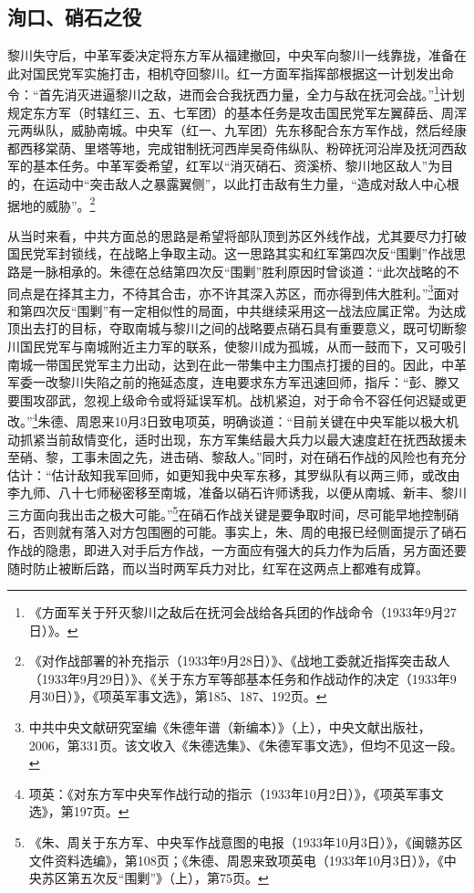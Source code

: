 \subsection{洵口、硝石之役}


黎川失守后，中革军委决定将东方军从福建撤回，中央军向黎川一线靠拢，准备在此对国民党军实施打击，相机夺回黎川。红一方面军指挥部根据这一计划发出命令：“首先消灭进逼黎川之敌，进而会合我抚西力量，全力与敌在抚河会战。”\footnote{《方面军关于歼灭黎川之敌后在抚河会战给各兵团的作战命令（1933年9月27日）》。}计划规定东方军（时辖红三、五、七军团）的基本任务是攻击国民党军左翼薛岳、周浑元两纵队，威胁南城。中央军（红一、九军团）先东移配合东方军作战，然后经康都西移棠荫、里塔等地，完成钳制抚河西岸吴奇伟纵队、粉碎抚河沿岸及抚河西敌军的基本任务。中革军委希望，红军以“消灭硝石、资溪桥、黎川地区敌人”为目的，在运动中“突击敌人之暴露翼侧”，以此打击敌有生力量，“造成对敌人中心根据地的威胁”。\footnote{《对作战部署的补充指示（1933年9月28日）》、《战地工委就近指挥突击敌人（1933年9月29日）》、《关于东方军等部基本任务和作战动作的决定（1933年9月30日）》，《项英军事文选》，第185、187、192页。}


从当时来看，中共方面总的思路是希望将部队顶到苏区外线作战，尤其要尽力打破国民党军封锁线，在战略上争取主动。这一思路其实和红军第四次反“围剿”作战思路是一脉相承的。朱德在总结第四次反“围剿”胜利原因时曾谈道：“此次战略的不同点是在择其主力，不待其合击，亦不许其深入苏区，而亦得到伟大胜利。”\footnote{中共中央文献研究室编《朱德年谱（新编本）》（上），中央文献出版社，2006，第331页。该文收入《朱德选集》、《朱德军事文选》，但均不见这一段。}面对和第四次反“围剿”有一定相似性的局面，中共继续采用这一战法应属正常。为达成顶出去打的目标，夺取南城与黎川之间的战略要点硝石具有重要意义，既可切断黎川国民党军与南城附近主力军的联系，使黎川成为孤城，从而一鼓而下，又可吸引南城一带国民党军主力出动，达到在此一带集中主力围点打援的目的。因此，中革军委一改黎川失陷之前的拖延态度，连电要求东方军迅速回师，指斥：“彭、滕又要围攻邵武，忽视上级命令或将延误军机。战机紧迫，对于命令不容任何迟疑或更改。”\footnote{项英：《对东方军中央军作战行动的指示（1933年10月2日）》，《项英军事文选》，第197页。}朱德、周恩来10月3日致电项英，明确谈道：“目前关键在中央军能以极大机动抓紧当前敌情变化，适时出现，东方军集结最大兵力以最大速度赶在抚西敌援未至硝、黎，工事未固之先，进击硝、黎敌人。”同时，对在硝石作战的风险也有充分估计：“估计敌知我军回师，如更知我中央军东移，其罗纵队有以两三师，或改由李九师、八十七师秘密移至南城，准备以硝石许师诱我，以便从南城、新丰、黎川三方面向我出击之极大可能。”\footnote{《朱、周关于东方军、中央军作战意图的电报（1933年10月3日）》，《闽赣苏区文件资料选编》，第108页；《朱德、周恩来致项英电（1933年10月3日）》，《中央苏区第五次反“围剿”》（上），第75页。}在硝石作战关键是要争取时间，尽可能早地控制硝石，否则就有落入对方包围圈的可能。事实上，朱、周的电报已经侧面提示了硝石作战的隐患，即进入对手后方作战，一方面应有强大的兵力作为后盾，另方面还要随时防止被断后路，而以当时两军兵力对比，红军在这两点上都难有成算。


